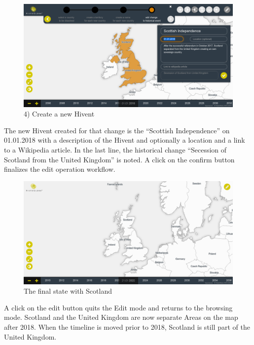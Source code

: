 \vspace{1em}
\begin{minipage}[t]{0.47\textwidth}

  \begin{figure}[H]
    \centering
    \includegraphics[width=1.0\textwidth]{graphics/development/user_interface_design_process/7_add_change_to_hivent_2.png}
    \caption{4) Create a new Hivent}
    \label{fig:final_7_add_change_to_hivent_2}
  \end{figure}

  The new Hivent created for that change is the ``Scottish Independence'' on 01.01.2018 with a description of the Hivent and optionally a location and a link to a Wikipedia article. In the last line, the historical change ``Secession of Scotland from the United Kingdom'' is noted. A click on the confirm button finalizes the edit operation workflow.

\end{minipage}    %
\hspace{1.5em}    %
\begin{minipage}[t]{0.47\textwidth}

  \begin{figure}[H]
    \centering
    \includegraphics[width=1.0\textwidth]{graphics/development/user_interface_design_process/8_final_state.png}
    \caption{The final state with Scotland}
    \label{fig:final_8_final_state}
  \end{figure}

  A click on the edit button quits the Edit mode and returns to the browsing mode. Scotland and the United Kingdom are now separate Areas on the map after 2018. When the timeline is moved prior to 2018, Scotland is still part of the United Kingdom.

\end{minipage}


